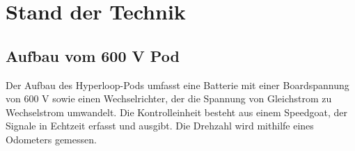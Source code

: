 \chapter{Stand der Technik}
\section{Aufbau vom 600 V Pod}

Der Aufbau des Hyperloop-Pods umfasst eine Batterie mit einer Boardspannung von 600 V sowie einen Wechselrichter, der die Spannung von Gleichstrom zu Wechselstrom umwandelt. Die Kontrolleinheit besteht aus einem Speedgoat, der Signale in Echtzeit erfasst und ausgibt. Die Drehzahl wird mithilfe eines Odometers gemessen.